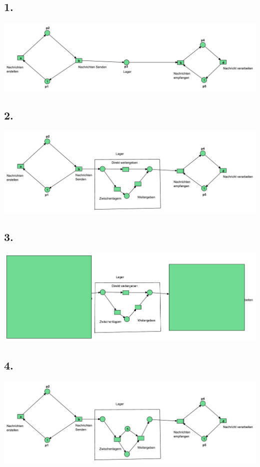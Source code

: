 \documentclass[12pt,a4paper]{article}
\begin{document}
\subsection*{1.}
\includegraphics[scale=0.5]{Teilaufgaben/Aufgabe1.pdf}
%

%
%
\subsection*{2.}
\includegraphics[scale=0.5]{Teilaufgaben/Aufgabe2.pdf}
%
%
\subsection*{3.}
%
\includegraphics[scale=0.5]{Teilaufgaben/Aufgabe3.pdf}

\subsection*{4.}
%
\includegraphics[scale=0.5]{Teilaufgaben/Aufgabe4.pdf}
\end{document}
